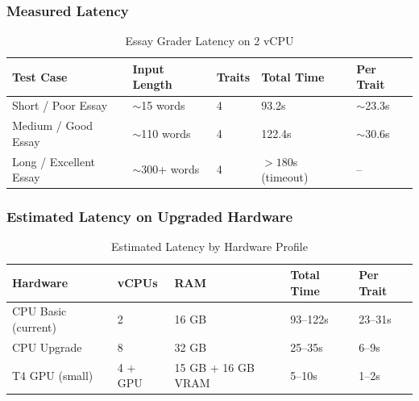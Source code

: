 \subsubsection{Measured Latency}
\renewcommand{\arraystretch}{1.15}
\setlength{\tabcolsep}{4pt}
\begin{table}[H]
\centering
\caption{Essay Grader Latency on 2 vCPU}
\label{tab:essay-latency}
\begin{tabular}{|p{3.6cm}|p{2.6cm}|p{1.6cm}|p{2.6cm}|p{2.6cm}|}
\hline
\textbf{Test Case} & \textbf{Input Length} & \textbf{Traits} & \textbf{Total Time} & \textbf{Per Trait} \\ \hline
Short / Poor Essay & $\sim$15 words & 4 & 93.2s & $\sim$23.3s \\ \hline
Medium / Good Essay & $\sim$110 words & 4 & 122.4s & $\sim$30.6s \\ \hline
Long / Excellent Essay & $\sim$300+ words & 4 & $>180$s (timeout) & -- \\ \hline
\end{tabular}
\end{table}

\subsubsection{Estimated Latency on Upgraded Hardware}
\renewcommand{\arraystretch}{1.15}
\setlength{\tabcolsep}{4pt}
\begin{table}[H]
\centering
\caption{Estimated Latency by Hardware Profile}
\label{tab:essay-latency-estimates}
\begin{tabular}{|p{3.2cm}|p{1.4cm}|p{1.6cm}|p{2.6cm}|p{2.6cm}|}
\hline
\textbf{Hardware} & \textbf{vCPUs} & \textbf{RAM} & \textbf{Total Time} & \textbf{Per Trait} \\ \hline
CPU Basic (current) & 2 & 16 GB & 93--122s & 23--31s \\ \hline
CPU Upgrade & 8 & 32 GB & 25--35s & 6--9s \\ \hline
T4 GPU (small) & 4 + GPU & 15 GB + 16 GB VRAM & 5--10s & 1--2s \\ \hline
\end{tabular}
\end{table}

